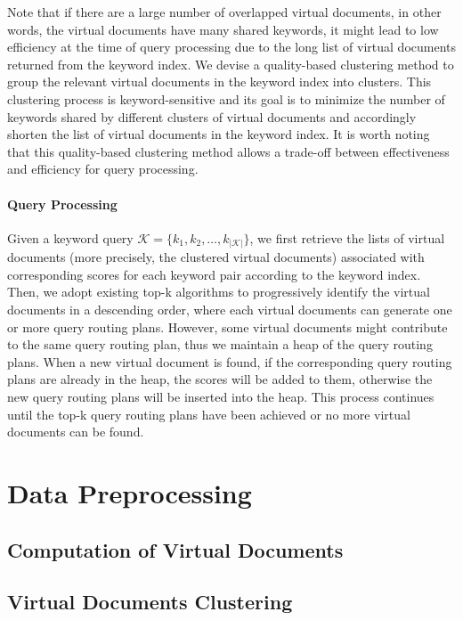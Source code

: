 Note that if there are a large number of overlapped virtual documents, in other words, the virtual
documents have many shared keywords, it might lead to low efficiency at the time of query processing
due to the long list of virtual documents returned from the keyword index. We devise a quality-based
clustering method to group the relevant virtual documents in the keyword index into clusters. This
clustering process is keyword-sensitive and its goal is to minimize the number of keywords shared by
different clusters of virtual documents and accordingly shorten the list of virtual documents in the
keyword index. It is worth noting that this quality-based clustering method allows a trade-off
between effectiveness and efficiency for query processing.

\paragraph{Query Processing}
Given a keyword query $\mathcal{K} = \{k_1,k_2,\ldots,k_{\left\vert\mathcal{K}\right\vert}\}$, we
first retrieve the lists of virtual documents (more precisely, the clustered virtual documents)
associated with corresponding scores for each keyword pair according to the keyword index. Then, we
adopt existing top-k algorithms to progressively identify the virtual documents in a descending
order, where each virtual documents can generate one or more query routing plans. However, some
virtual documents might contribute to the same query routing plan, thus we maintain a heap of the
query routing plans. When a new virtual document is found, if the corresponding query routing plans
are already in the heap, the scores will be added to them, otherwise the new query routing plans will
be inserted into the heap. This process continues until the top-k query routing plans have been
achieved or no more virtual documents can be found.


\section{Data Preprocessing}\label{qr:preprocessing}


\subsection{Computation of Virtual Documents}\label{qr:vdcompute}


\subsection{Virtual Documents Clustering}\label{qr:vdcluster}

